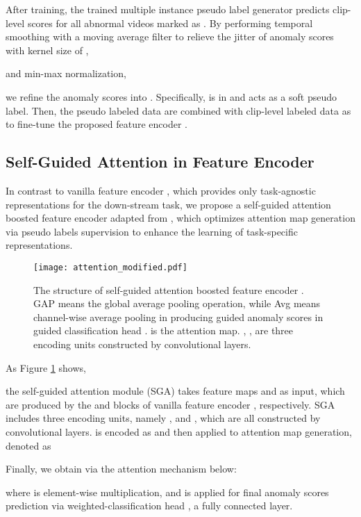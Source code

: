 \documentclass[final]{cvpr}
\newcommand{\ftst}{\textcolor[rgb]{0,0, 0}}
\newcommand{\ftnd}{\textcolor[rgb]{0.,0,0}}
\newcommand{\jcst}{\textcolor[rgb]{0,0,0}}
\newcommand{\jcca}{\textcolor[rgb]{0,0,0}}
\begin{document}
After training, the trained multiple instance pseudo label generator predicts clip-level scores for all abnormal videos marked as .
By performing temporal smoothing with a moving average filter to relieve the jitter of anomaly scores with kernel size of ,

and min-max normalization,

we refine the anomaly scores into . Specifically,  is in  and acts as a soft pseudo label. Then, the pseudo labeled data  are combined with clip-level labeled data  as  to fine-tune the proposed feature encoder .

\vspace{-0.1cm}
\subsection{Self-Guided Attention in Feature Encoder}\label{sec:attention}
\vspace{-0.1cm}
\jcca{In contrast to} vanilla feature encoder , which provides only task-agnostic representations for the down-stream task, we propose a self-guided attention boosted feature encoder  adapted from , which optimizes attention map generation \jcca{via} pseudo labels \jcca{supervision} to enhance the learning of task-specific representations.

\begin{figure}
    \centering
    \texttt{[image: attention\_modified.pdf]}
    \caption{The \jcst{structure of self-guided attention boosted feature encoder . GAP means the global average pooling operation, while Avg means  channel-wise average pooling in producing guided anomaly scores in guided classification head .  is the attention map. \jcca{, ,  are three encoding units constructed by convolutional layers.}}}
    \label{fig:attention}
    \vspace{-2mm}
\end{figure}

\ftst{As Figure \ref{fig:attention} shows, 
\jcst{the self-guided attention module (SGA) takes feature maps  and  as input, which are produced by the  and  blocks of vanilla feature encoder , respectively. 
\jcca{SGA includes three encoding units, namely ,  and , which are all constructed by convolutional layers.}
 is encoded as  and then applied to attention map  generation\jcca{,  denoted as}

Finally, \ftst{we obtain}  via the attention mechanism below:}}

\jcst{where \jcca{ is element-wise multiplication, } and  is applied for final anomaly scores prediction via weighted-classification head , \ftnd{a fully connected layer.}}
\end{document}
